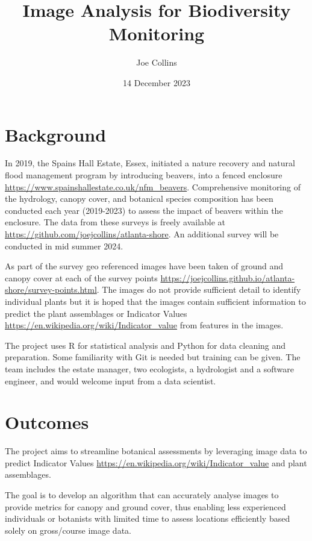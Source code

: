 \documentclass{roles}
\title{Image Analysis for Biodiversity Monitoring}
\author{Joe Collins}
\date{14 December 2023}
\begin{document}
\maketitle

\section*{Background}

In 2019, the Spains Hall Estate, Essex,
initiated a nature recovery and natural flood management program by introducing beavers,
into a fenced enclosure 
\href{https://www.spainshallestate.co.uk/nfm\_beavers}{https://www.spainshallestate.co.uk/nfm\_beavers}.
Comprehensive monitoring of
the hydrology, canopy cover, and botanical species composition
has been conducted each year (2019-2023)
to assess the impact of beavers within the enclosure.
The data from these surveys is freely available at 
\href{https://github.com/joejcollins/atlanta-shore}{https://github.com/joejcollins/atlanta-shore}.
An additional survey will be conducted in mid summer 2024.

As part of the survey geo referenced images have been taken
of ground and canopy cover at each of the survey points 
\href{https://joejcollins.github.io/atlanta-shore/survey-points.html}{https://joejcollins.github.io/atlanta-shore/survey-points.html}.
The images do not provide sufficient detail to identify individual plants
but it is hoped that the images contain sufficient information to predict
the plant assemblages or Indicator Values 
\href{https://en.wikipedia.org/wiki/Indicator\_value}{https://en.wikipedia.org/wiki/Indicator\_value}
from features in the images.

The project uses R for statistical analysis and Python for data cleaning and preparation.
Some familiarity with Git is needed but training can be given.
The team includes the estate manager, two ecologists, a hydrologist and a software engineer,
and would welcome input from a data scientist.

\section*{Outcomes}

The project aims to streamline botanical assessments by leveraging image data to predict Indicator Values 
\href{https://en.wikipedia.org/wiki/Indicator\_value}{https://en.wikipedia.org/wiki/Indicator\_value} and plant assemblages.

The goal is to develop an algorithm that can accurately analyse images
to provide metrics for canopy and ground cover,
thus enabling less experienced individuals or
botanists with limited time to assess locations efficiently
based solely on gross/course image data.
\end{document}
